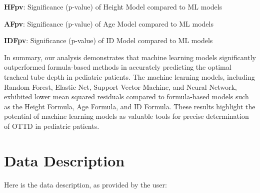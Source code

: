 \documentclass[11pt]{article}
\begin{document}
\begin{table}[h]
\caption{Significance (p-value) in Prediction Errors between Machine Learning Models and Formula-based Models}
\label{table:pv_comparison}
\begin{threeparttable}
\renewcommand{\TPTminimum}{\linewidth}
\begin{tablenotes}
\footnotesize
\item \textbf{HFpv}: Significance (p-value) of Height Model compared to ML models
\item \textbf{AFpv}: Significance (p-value) of Age Model compared to ML models
\item \textbf{IDFpv}: Significance (p-value) of ID Model compared to ML models
\end{tablenotes}
\end{threeparttable}
\end{table}


In summary, our analysis demonstrates that machine learning models significantly outperformed formula-based methods in accurately predicting the optimal tracheal tube depth in pediatric patients. The machine learning models, including Random Forest, Elastic Net, Support Vector Machine, and Neural Network, exhibited lower mean squared residuals compared to formula-based models such as the Height Formula, Age Formula, and ID Formula. These results highlight the potential of machine learning models as valuable tools for precise determination of OTTD in pediatric patients.


\clearpage
\appendix

\section{Data Description} \label{sec:data_description} Here is the data description, as provided by the user:
\end{document}
